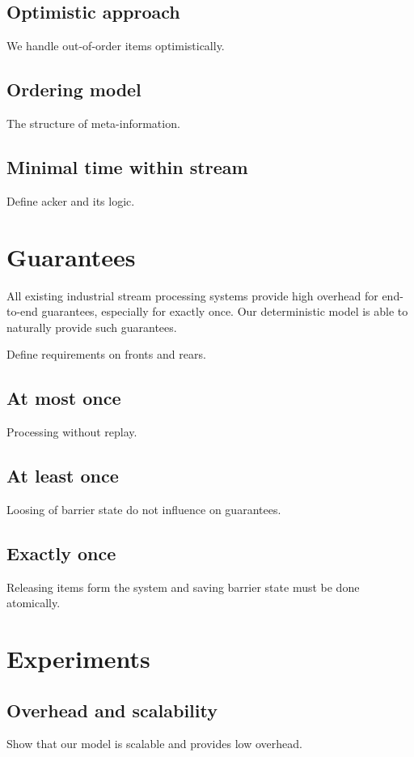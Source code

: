 \documentclass[sigconf]{acmart}
\theoremstyle{remark}
\begin{document}
\subsection{Optimistic approach}
We handle out-of-order items optimistically.

\subsection{Ordering model}
The structure of meta-information.

\subsection{Minimal time within stream}
Define acker and its logic.

\section{Guarantees}

All existing industrial stream processing systems provide high overhead for end-to-end guarantees, especially for exactly once. Our deterministic model is able to naturally provide such guarantees.

Define requirements on fronts and rears.

\subsection{At most once}
Processing without replay.

\subsection{At least once}
Loosing of barrier state do not influence on guarantees.

\subsection{Exactly once}
Releasing items form the system and saving barrier state must be done atomically.

\section {Experiments}

\subsection{Overhead and scalability}
Show that our model is scalable and provides low overhead.
\end{document}
